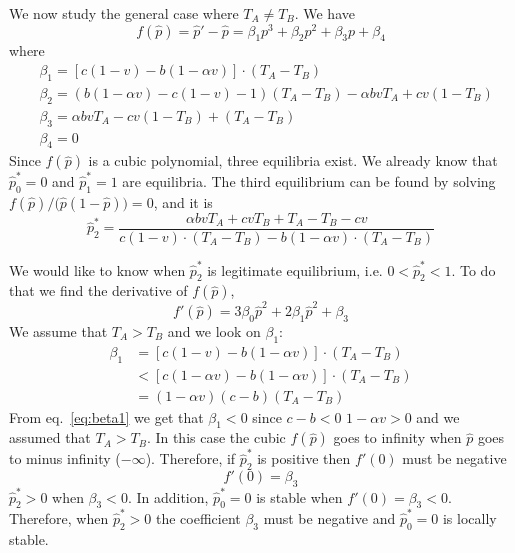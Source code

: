 \documentclass[12pt]{extarticle}
\begin{document}
We now study the general case where $T_A \neq T_B$. We have
\begin{equation} \label{eq:general_case_polynomial}
  f(\hat{p}) = \hat{p}'-\hat{p} = \beta_1p^3 + \beta_2 p^2 + \beta_3p + \beta_4
\end{equation}
where 
\begin{equation} \label{eq:polynomial_coefficients}
\begin{split}
  & \beta_1 = [c(1-v) -b (1-\alpha v)] \cdot(T_A-T_B) \\
  & \beta_2 = (b(1-\alpha v)-c(1-v)-1)(T_A-T_B)-\alpha bv T_A + cv(1-T_B) \\
  & \beta_3 = \alpha bvT_A - cv(1-T_B) + (T_A-T_B) \\
  & \beta_4 = 0
\end{split}
\end{equation}
Since $f(\hat{p})$ is a cubic polynomial, three equilibria exist.
We already know that $\hat{p}^*_0 = 0 $ and $\hat{p}^*_1 = 1$ are equilibria.
The third equilibrium can be found by solving $f(\hat{p})/\big(\hat{p}(1-\hat{p})\big)=0$, and it is
\begin{equation} \label{eq:oblique_and_vertic_result}
  \hat{p}^*_2 =  \frac{\alpha bvT_A + cvT_B + T_A-T_B-cv}{c(1-v)\cdot(T_A-T_B) -b (1-\alpha v) \cdot(T_A-T_B)}
\end{equation}

We would like to know when $\hat{p}^*_2$ is legitimate equilibrium, i.e. $0<\hat{p}^*_2<1$.  
To do that we find the derivative  of $f(\hat{p})$,
\begin{equation} \label{eq:derivative_of_phattag-phat2}
  f'(\hat{p}) = 3\beta_0 \hat{p}^2 + 2\beta_1\hat{p}^2 + \beta_3
 \end{equation}
We assume that $T_A>T_B$ and we look on $\beta_1$:
\begin{equation} \label{eq:beta1}
  \begin{split}
   \beta_1 & = [c(1-v) -b (1-\alpha v)] \cdot(T_A-T_B) \\
   &< [c(1-\alpha v) - b(1-\alpha v)]\cdot(T_A-T_B) \\
   &= (1-\alpha v)(c-b)(T_A-T_B)
  \end{split}
 \end{equation}
From eq.~\ref{eq:beta1} we get that $\beta_1<0$ since $c-b<0$ $1-\alpha v>0$ and we assumed that $T_A > T_B$.
In this case the cubic $f(\hat{p})$ goes to infinity when $\hat{p}$ goes to minus infinity ($-\infty$). 
Therefore, if $\hat{p}^*_2$ is positive then $f'(0)$ must be negative %
\begin{equation} \label{eq:derivative_of_phattag-phat_p=0}
  f'(0) = \beta_3
 \end{equation}
$\hat{p}^*_2>0$ when $\beta_3<0$.
In addition, $\hat{p}^*_0=0$ is stable when $f'(0) = \beta_3 <0$.
Therefore, when $\hat{p}^*_2>0$ the coefficient $\beta_3$ must be negative and $\hat{p}^*_0=0$ is locally stable. 
\end{document}
